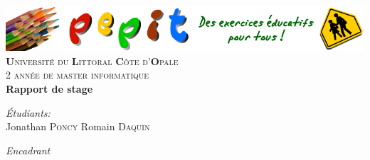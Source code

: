 
\begin{titlepage}

\begin{center}


\includegraphics[width=16cm]{images/pepit-logo}\\[1cm]    

\textsc{\LARGE \textbf{U}niversité du \textbf{L}ittoral \textbf{C}ôte d'\textbf{O}pale}\\[1.5cm]
\textsc{\Large 2\ieme{} année de master informatique}\\[0.5cm]


{ \huge \bfseries Rapport de stage}\\[0.4cm]


\begin{minipage}{0.3\textwidth}
\begin{flushleft} \large
\emph{Étudiants:}\\
Jonathan \textsc{Poncy}
Romain \textsc{Daquin}
\end{flushleft}
\end{minipage}
\begin{minipage}{0.3\textwidth}
\begin{flushright} \large
\emph{Encadrant} \\
\responsableProjet
\end{flushright}
\end{minipage}

\vfill


\end{center}
\end{titlepage}
